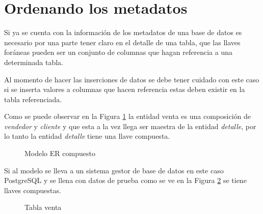\section{Ordenando los metadatos}
Si ya se cuenta con la informaci\'on de los metadatos de una base de datos es necesario por una parte tener claro en el detalle de una tabla, que las llaves for\'aneas pueden ser un conjunto de columnas que hagan referencia a una determinada tabla.

Al momento de hacer las inserciones de datos se debe tener cuidado con este caso si se inserta valores a columnas que hacen referencia estas deben existir en la tabla referenciada.

Como se puede observar en la Figura \ref{fig:ModeloERcomp} la entidad venta es una composici\'on de \textit{vendedor} y \textit{cliente} y que esta a la vez llega ser maestra de la entidad \textit{detalle}, por lo tanto la entidad \textit{detalle} tiene una llave compuesta.
\begin{figure}[H]
\centering
{}
\caption{Modelo ER compuesto} \label{fig:ModeloERcomp}
\end{figure}
Si al modelo se lleva a un sistema gestor de base de datos en este caso PostgreSQL y se llena con datos de prueba como se ve en la Figura \ref{fig:tabla venta} se tiene  llaves compuestas.
\begin{figure}[H]
\centering
{}
\caption{Tabla venta} \label{fig:tabla venta}
\end{figure}

